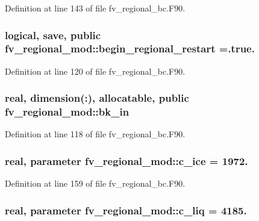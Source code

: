 Definition at line 143 of file fv\-\_\-regional\-\_\-bc.\-F90.

\subsubsection[{begin\-\_\-regional\-\_\-restart}]{\setlength{\rightskip}{0pt plus 5cm}logical, save, public fv\-\_\-regional\-\_\-mod\-::begin\-\_\-regional\-\_\-restart =.true.}\label{classfv__regional__mod_aa9895dcedb85e93e3ab4b513ec927084}


Definition at line 120 of file fv\-\_\-regional\-\_\-bc.\-F90.

\subsubsection[{bk\-\_\-in}]{\setlength{\rightskip}{0pt plus 5cm}real, dimension(\-:), allocatable, public fv\-\_\-regional\-\_\-mod\-::bk\-\_\-in}\label{classfv__regional__mod_ae7e070a83ea46499a4477fdbfbc7a9ce}


Definition at line 118 of file fv\-\_\-regional\-\_\-bc.\-F90.

\subsubsection[{c\-\_\-ice}]{\setlength{\rightskip}{0pt plus 5cm}real, parameter fv\-\_\-regional\-\_\-mod\-::c\-\_\-ice = 1972.\hspace{0.3cm}{\ttfamily [private]}}\label{classfv__regional__mod_a2d3e253e8cfeeb07d467f80cc3e02db6}


Definition at line 159 of file fv\-\_\-regional\-\_\-bc.\-F90.

\subsubsection[{c\-\_\-liq}]{\setlength{\rightskip}{0pt plus 5cm}real, parameter fv\-\_\-regional\-\_\-mod\-::c\-\_\-liq = 4185.\hspace{0.3cm}{\ttfamily [private]}}\label{classfv__regional__mod_a7c984c269922724e4ec90ab8e39c3497}


